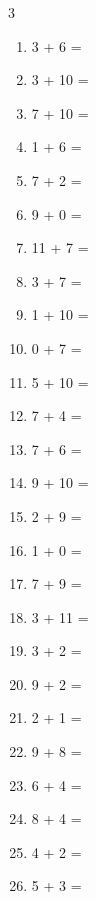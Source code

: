 \documentclass[a4paper, 11pt]{article}
\begin{document}
\begin{multicols}{3}
\begin{enumerate}
      \item 3 + 6 = \dotfill\bigskip
      \item 3 + 10 = \dotfill\bigskip
      \item 7 + 10 = \dotfill\bigskip
      \item 1 + 6 = \dotfill\bigskip
      \item 7 + 2 = \dotfill\bigskip
      \item 9 + 0 = \dotfill\bigskip
      \item 11 + 7 = \dotfill\bigskip
      \item 3 + 7 = \dotfill
      \item 1 + 10 = \dotfill\bigskip
      \item 0 + 7 = \dotfill\bigskip
      \item 5 + 10 = \dotfill\bigskip
      \item 7 + 4 = \dotfill\bigskip
      \item 7 + 6 = \dotfill\bigskip
      \item 9 + 10 = \dotfill\bigskip
      \item 2 + 9 = \dotfill\bigskip
      \item 1 + 0 = \dotfill\bigskip
      \item 7 + 9 = \dotfill\bigskip
      \item 3 + 11 = \dotfill\bigskip
      \item 3 + 2 = \dotfill\bigskip
      \item 9 + 2 = \dotfill\bigskip
      \item 2 + 1 = \dotfill\bigskip
      \item 9 + 8 = \dotfill\bigskip
      \item 6 + 4 = \dotfill\bigskip
      \item 8 + 4 = \dotfill\bigskip
      \item 4 + 2 = \dotfill\bigskip
      \item 5 + 3 = \dotfill
    \end{enumerate}
\end{multicols}
\end{document}
